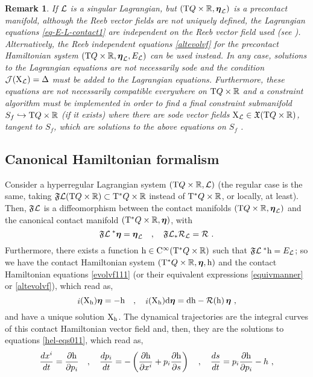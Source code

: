 \documentclass[12pt]{report}
\newtheorem{remark}[teor]{Remark}
\def\beq{\begin{equation}}
\def\eeq{\end{equation}}
\def\dst{\displaystyle}
\def\vf{\mathfrak X}
\def\Lag{{\cal L}}
\def\d{{\rm d}}
\def\Real{\mathbb{R}}
\def\bmeta{\mbox{\boldmath $\eta$}}
\def\X{{\rm X}}
\def\Tan{{\rm T}}
\def\inn{\mathop{i}\nolimits}
\def\Cinfty{{\rm C}^\infty}
\newcommand{\Reeb}{\mathcal{R}}
\begin{document}
\begin{remark}{\rm
If $\Lag$ is a singular Lagrangian, but $(\Tan Q\times\Real,\bmeta_\Lag)$ is a precontact manifold, although the Reeb vector fields
are not uniquely defined, the Lagrangian equations \eqref{eq-E-L-contact1} 
are independent on the Reeb vector field used (see \cite{DeLeon2019}).
Alternatively, the Reeb independent equations \eqref{altevolvf}
for the precontact Hamiltonian system $(\Tan Q\times\Real,\bmeta_\Lag, E_\Lag)$
can be used instead.
In any case, solutions to the Lagrangian equations
are not necessarily {\sc sode} and
the condition ${\cal J}(\X_\Lag)=\Delta$ must be added to the Lagrangian equations.
Furthermore, these equations are not necessarily compatible everywhere on $\Tan Q\times\Real$ 
and a constraint algorithm must be implemented in order to find 
a final constraint submanifold $S_f\hookrightarrow\Tan Q\times\Real$
(if it exists) where there are {\sc sode} vector fields $\X_\Lag\in\vf(\Tan Q\times\Real)$,
tangent to $S_f$, which are solutions to the above equations on $S_f$ \cite{DeLeon2019}.
}\end{remark}


\subsection{Canonical Hamiltonian formalism}


Consider a hyperregular Lagrangian system $(\Tan Q\times\Real,\Lag)$
(the regular case is the same, taking $\mathfrak{F}\Lag (\Tan Q\times\Real)\subset\Tan^*Q\times\Real$ instead of $\Tan^*Q\times\Real$, or locally, at least).
Then, $\mathfrak{F}\Lag$ is a diffeomorphism
between the contact manifolds $(\Tan Q\times\Real,\bmeta_\Lag)$ and
the canonical contact manifold
$(\Tan^*Q\times\Real,\bmeta)$,
with 
$$
\mathfrak{F}\Lag^{\;*}\bmeta=\bmeta_\Lag\quad , \quad
\mathfrak{F}\Lag_*{\Reeb}_\Lag={\Reeb} \ .
$$
Furthermore, there exists a function ${\rm h}\in\Cinfty(\Tan^*Q\times\Real)$ 
such that $\mathfrak{F}\Lag^{\;*}{\rm h}=E_\Lag$;
so we have the contact Hamiltonian system $(\Tan^*Q\times\Real,\bmeta,{\rm h})$
and the contact Hamiltonian equations \eqref{evolvf111}
(or their equivalent expressions \eqref{equivmanner} or
\eqref{altevolvf}),
which read as,
\beq
\inn(\X_{\rm h})\bmeta=-{\rm h} \quad,\quad 
\inn(\X_{\rm h})\d\bmeta = \d{\rm h}-\Reeb({\rm h})\,\bmeta\ ,
\label{evolvf11b}
\eeq
and have a unique solution $\X_{\rm h}$.
The dynamical trajectories are the integral curves
of this contact Hamiltonian vector field and, then, they are the solutions to equations \eqref{hel-eqs011}, which read as,
\beq
\label{hel-eqs01b}
\dst\frac{dx^i}{dt} = \frac{\partial{\rm h}}{\partial p_i}\quad ,\quad
\dst\frac{dp_i}{dt} = -\left(\frac{\partial{\rm h}}{\partial x^i} + p_i\frac{\partial{\rm h}}{\partial s}\right)\quad , \quad
\dst\frac{ds}{dt} = p_i\frac{\partial{\rm h}}{\partial p_i} - h \ , 
\eeq
\end{document}
